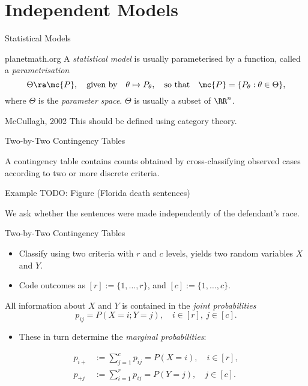 \section{Independent Models}

\begin{frame}{Statistical Models}
    \begin{block}{planetmath.org}
    A \emph{statistical model} is usually parameterised by a function, called a \emph{parametrisation}
    $$ \Theta \ra \mc{P}, \quad \text{given by} \quad \theta \mapsto P_{\theta},\quad \text{so that}\quad \mc{P} = \{ P_{\theta} : \theta \in \Theta \}, $$
    where $\Theta$ is the \emph{parameter space}. $\Theta$ is usually a subset of $\RR^{n}$.
    \end{block}

    \begin{block}{McCullagh, 2002}
    This should be defined using category theory.
    \end{block}
\end{frame}

\begin{frame}{Two-by-Two Contingency Tables}
    
    A contingency table contains counts obtained by cross-classifying observed cases according to two or more discrete criteria.

    \begin{block}{Example}
        TODO: Figure (Florida death sentences)
    \end{block}

    We ask whether the sentences were made independently of the defendant's race.
\end{frame}

\begin{frame}{Two-by-Two Contingency Tables}
    
    \begin{itemize}
        \item Classify using two criteria with $r$ and $c$ levels, yields two random variables $X$ and $Y$. 
        \item Code outcomes as $[r] := \{1,\ldots, r\}$, and $[c] := \{ 1, \ldots, c \}$.
    \end{itemize}
    
    All information about $X$ and $Y$ is contained in the \emph{joint probabilities}
    $$ p_{ij} = P(X = i; Y = j), \quad i \in [r],\ j \in [c]. $$

    \begin{itemize}
        \item These in turn determine the \emph{marginal probabilities}:
    \end{itemize}

    \begin{equation*}
        \begin{split}
            p_{i+} &:= \sum_{j = 1}^{c} p_{ij} = P(X = i), \quad i \in [r], \\
            p_{+j} &:= \sum_{i = 1}^{r} p_{ij} = P(Y = j), \quad j \in [c].
        \end{split}
    \end{equation*}

\end{frame}

